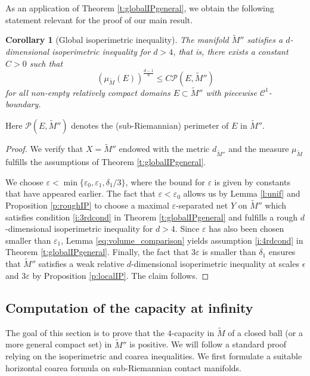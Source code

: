 \documentclass[10pt,letterpaper]{amsart}
\newtheorem{cor}[thm]{Corollary}
\theoremstyle{definition}
\numberwithin{thm}{subsection}
\numberwithin{equation}{section}
\begin{document}
As an application of Theorem \ref{t:globalIPgeneral}, we obtain the following statement relevant for the proof of our main result.

\begin{cor}[Global isoperimetric inequality]\label{p:isoperim_global}
The manifold $\widetilde{M}''$  satisfies a $d$-dimensional isoperimetric inequality for $d>4$, that is, there exists a constant $C>0$ such that
\begin{displaymath}
\left(\mu_{\widetilde{M}}( E)\right)^{\frac{d-1}{d}}\leq C \mathcal{P}(E,\widetilde{M}'')
\end{displaymath}
for all non-empty relatively compact domains $E\subset \widetilde{M}''$ with piecewise $\mathcal{C}^1$-boundary.
\end{cor}
Here $\mathcal{P}(E,\widetilde{M}'')$ denotes the (sub-Riemannian) perimeter of $E$ in $\widetilde{M}''$.

\begin{proof}
We verify that $X=\widetilde{M}''$ endowed with the metric $d_{\widetilde{M}''}$ and the measure $\mu_{\widetilde{M}}$ fulfills the assumptions of Theorem \ref{t:globalIPgeneral}.

We choose $\varepsilon< \min \{\varepsilon_0,\varepsilon_1, \delta_1/3\}$, where the bound for $\varepsilon$ is given by constants that have appeared earlier.
The fact that $\varepsilon< \varepsilon_0$ allows us by Lemma \ref{l:unif}  and Proposition
\ref{p:roughIP} to choose a maximal $\varepsilon$-separated net $Y$ on $\widetilde{M}''$ which satisfies condition \eqref{i:3rdcond} in Theorem \ref{t:globalIPgeneral} and fulfills a rough $d$-dimensional isoperimetric inequality for $d>4$. Since $\varepsilon$ has also been chosen smaller than $\varepsilon_1$, Lemma \ref{eq:volume_comparison} yields assumption \eqref{i:4rdcond} in Theorem \ref{t:globalIPgeneral}. Finally, the fact that $3\varepsilon$ is smaller than $\delta_1$ ensures that $\widetilde{M}''$ satisfies a weak relative $d$-dimensional isoperimetric inequality at scales $\epsilon$ and $3\varepsilon$ by Proposition \ref{p:localIP}. The claim follows.
\end{proof}

\subsection{Computation of the capacity at infinity}\label{ss:cap}
The goal of this section is to prove that the $4$-capacity in $\widetilde{M}$ of a closed ball (or a more general compact set) in $\widetilde{M}''$ is positive. We will follow a standard proof relying on the isoperimetric and coarea inequalities. We first formulate a suitable horizontal coarea formula on sub-Riemannian contact manifolds.
\end{document}
